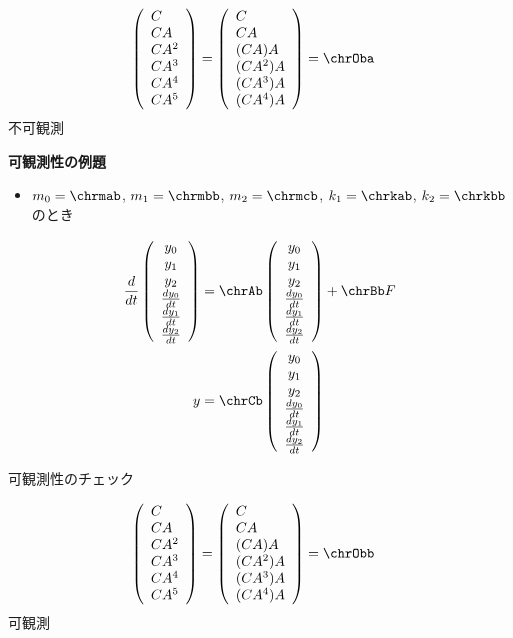 \begin{align}
 \left(\begin{array}{l}
        C \\
        CA \\
        CA^2  \\
	CA^3 \\
	CA^4 \\
	CA^5
       \end{array}\right)
 &=
 \left(\begin{array}{l}
        C \\
        CA \\
        (CA)A  \\
	(CA^2)A \\
	(CA^3)A \\
	(CA^4)A
       \end{array}\right)
 =
 \chrOba
\nonumber
\end{align}
不可観測




\newpage
\noindent
{\bf 可観測性の例題}

\begin{itemize}
\item $m_0=\chrmab$, $m_1=\chrmbb$, $m_2=\chrmcb$, $k_1=\chrkab$, $k_2=\chrkbb$のとき
\end{itemize}

\begin{align}
 \frac{d}{dt} \statev  
 &=
 \chrAb \statev + \chrBb F
\nonumber
\\
 y 
 &= \chrCb \statev 
\nonumber
\end{align}

可観測性のチェック

\begin{align}
 \left(\begin{array}{l}
        C \\
        CA \\
        CA^2  \\
	CA^3 \\
	CA^4 \\
	CA^5
       \end{array}\right)
 &=
 \left(\begin{array}{l}
        C \\
        CA \\
        (CA)A  \\
	(CA^2)A \\
	(CA^3)A \\
	(CA^4)A
       \end{array}\right)
 =
 \chrObb
\nonumber
\end{align}
可観測






